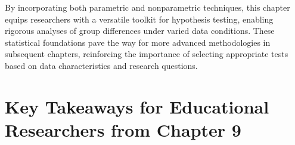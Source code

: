 \documentclass[
  letterpaper,
  DIV=11,
  numbers=noendperiod]{scrreprt}
\begin{document}
By incorporating both parametric and nonparametric techniques, this
chapter equips researchers with a versatile toolkit for hypothesis
testing, enabling rigorous analyses of group differences under varied
data conditions. These statistical foundations pave the way for more
advanced methodologies in subsequent chapters, reinforcing the
importance of selecting appropriate tests based on data characteristics
and research questions.

\section*{Key Takeaways for Educational Researchers from Chapter
9}\label{key-takeaways-for-educational-researchers-from-chapter-9}

\end{document}
